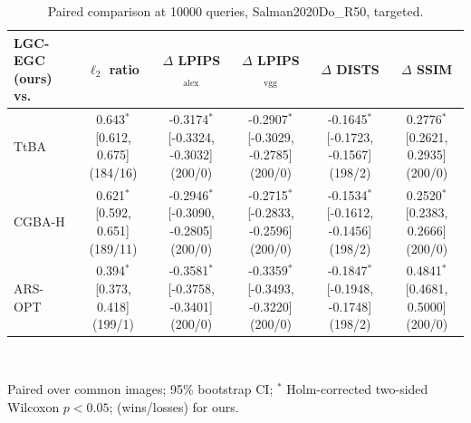 \begin{table}[t]
\centering\footnotesize
\caption{Paired comparison at 10000 queries, Salman2020Do\_R50, targeted.}
\begin{tabular}{lccccc}
\toprule
LGC-EGC (ours) vs. & $\ell_2$ ratio & $\Delta$ LPIPS$_{\mathrm{alex}}$ & $\Delta$ LPIPS$_{\mathrm{vgg}}$ & $\Delta$ DISTS & $\Delta$ SSIM \\
\midrule
TtBA & 0.643$^{*}$ [0.612, 0.675] (184/16) & -0.3174$^{*}$ [-0.3324, -0.3032] (200/0) & -0.2907$^{*}$ [-0.3029, -0.2785] (200/0) & -0.1645$^{*}$ [-0.1723, -0.1567] (198/2) & 0.2776$^{*}$ [0.2621, 0.2935] (200/0) \\
CGBA-H & 0.621$^{*}$ [0.592, 0.651] (189/11) & -0.2946$^{*}$ [-0.3090, -0.2805] (200/0) & -0.2715$^{*}$ [-0.2833, -0.2596] (200/0) & -0.1534$^{*}$ [-0.1612, -0.1456] (198/2) & 0.2520$^{*}$ [0.2383, 0.2666] (200/0) \\
ARS-OPT & 0.394$^{*}$ [0.373, 0.418] (199/1) & -0.3581$^{*}$ [-0.3758, -0.3401] (200/0) & -0.3359$^{*}$ [-0.3493, -0.3220] (200/0) & -0.1847$^{*}$ [-0.1948, -0.1748] (198/2) & 0.4841$^{*}$ [0.4681, 0.5000] (200/0) \\
\bottomrule
\end{tabular}
\\[2pt]\parbox{\linewidth}{\scriptsize Paired over common images; 95\% bootstrap CI; $^{*}$ Holm-corrected two-sided Wilcoxon $p<0.05$; (wins/losses) for ours.}
\end{table}
